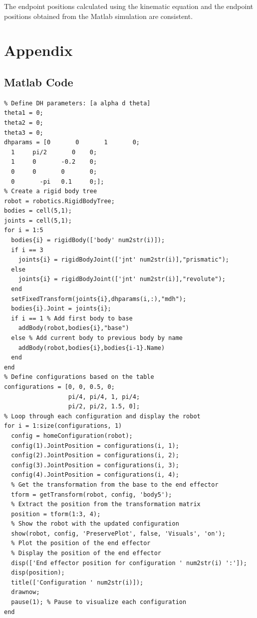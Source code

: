 \documentclass{article}
\begin{document}
The endpoint positions calculated using the kinematic equation and the endpoint positions obtained from the Matlab simulation are consistent.

\newpage

\section*{Appendix}
\subsection*{Matlab Code}
\begin{verbatim}
% Define DH parameters: [a alpha d theta]
theta1 = 0;
theta2 = 0;
theta3 = 0;
dhparams = [0   	0   	1   	0;
  1	    pi/2       0    0;
  1	    0	    -0.2	0;
  0   	0   	0   	0;
  0       -pi 	0.1   	0;];
% Create a rigid body tree
robot = robotics.RigidBodyTree;
bodies = cell(5,1);
joints = cell(5,1);
for i = 1:5
  bodies{i} = rigidBody(['body' num2str(i)]);
  if i == 3
    joints{i} = rigidBodyJoint(['jnt' num2str(i)],"prismatic");
  else
    joints{i} = rigidBodyJoint(['jnt' num2str(i)],"revolute");
  end
  setFixedTransform(joints{i},dhparams(i,:),"mdh");
  bodies{i}.Joint = joints{i};
  if i == 1 % Add first body to base
    addBody(robot,bodies{i},"base")
  else % Add current body to previous body by name
    addBody(robot,bodies{i},bodies{i-1}.Name)
  end
end
% Define configurations based on the table
configurations = [0, 0, 0.5, 0;
                  pi/4, pi/4, 1, pi/4;
                  pi/2, pi/2, 1.5, 0];
% Loop through each configuration and display the robot
for i = 1:size(configurations, 1)
  config = homeConfiguration(robot);
  config(1).JointPosition = configurations(i, 1);
  config(2).JointPosition = configurations(i, 2);
  config(3).JointPosition = configurations(i, 3);
  config(4).JointPosition = configurations(i, 4);
  % Get the transformation from the base to the end effector  
  tform = getTransform(robot, config, 'body5');
  % Extract the position from the transformation matrix
  position = tform(1:3, 4);
  % Show the robot with the updated configuration
  show(robot, config, 'PreservePlot', false, 'Visuals', 'on');
  % Plot the position of the end effector
  % Display the position of the end effector
  disp(['End effector position for configuration ' num2str(i) ':']);
  disp(position);
  title(['Configuration ' num2str(i)]);
  drawnow;
  pause(1); % Pause to visualize each configuration
end
\end{verbatim}
\end{document}
